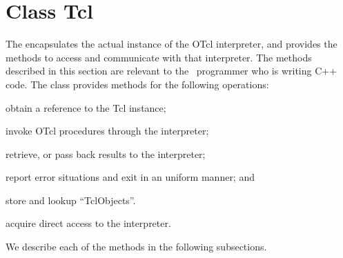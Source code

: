 \section{Class Tcl}
\label{sec:Tcl}

The  encapsulates the actual instance of
the OTcl interpreter, and provides the methods
to access and communicate with that interpreter.
The methods described in this section are relevant to the
\ns\ programmer who is writing C++ code.
The class provides methods for the following operations:
\begin{list}{\textbullet}{}\itemsep0pt
\item obtain a reference to the Tcl instance;
\item invoke OTcl procedures through the interpreter;
\item retrieve, or pass back results to the interpreter;
\item report error situations and exit in an uniform manner; and
\item store and lookup ``TclObjects''.
\item acquire direct access to the interpreter.
\end{list}
We describe each of the methods in the following subsections.

